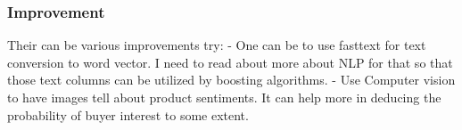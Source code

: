 \documentclass[11pt]{article}
\begin{document}
    \hypertarget{improvement}{%
\subsubsection{Improvement}\label{improvement}}

    Their can be various improvements try: - One can be to use fasttext for
text conversion to word vector. I need to read about more about NLP for
that so that those text columns can be utilized by boosting algorithms.
- Use Computer vision to have images tell about product sentiments. It
can help more in deducing the probability of buyer interest to some
extent.


    
    
    
    
\end{document}
